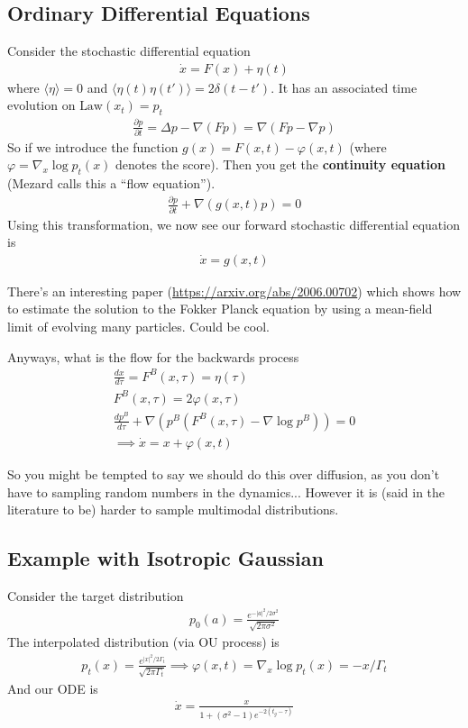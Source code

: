 \subsection{Ordinary Differential Equations}
Consider the stochastic differential equation
\begin{align}
	\dot x = F(x) + \eta(t)
\end{align}
where $\langle \eta \rangle = 0$ and $\langle \eta(t) \eta(t') \rangle = 2 \delta(t- t')$. It has an associated time evolution on $\text{Law}(x_t) = p_t$
\begin{align}
	\frac{\partial p}{\partial t} = \Delta p - \nabla (F p) = \nabla (F p - \nabla p)
\end{align}
So if we introduce the function $g(x) = F(x,t) - \varphi(x,t)$ (where $\varphi = \nabla_x \log p_t(x)$ denotes the score). Then you get the \textbf{continuity equation} (Mezard calls this a ``flow equation'').
\begin{align}
	\frac{\partial p}{\partial t} + \nabla (g(x,t) p) = 0
\end{align}
Using this transformation, we now see our forward stochastic differential equation is
\begin{align}
	\dot x = g(x,t)
\end{align}
\begin{sidework}
	There's an interesting paper (\url{https://arxiv.org/abs/2006.00702}) which shows how to estimate the solution to the Fokker Planck equation by using a mean-field limit of evolving many particles. Could be cool.
\end{sidework}
Anyways, what is the flow for the backwards process
\begin{align}
	\frac{dx}{d\tau} = F^B(x,\tau) = \eta(\tau)\\
	F^B (x,\tau) = 2 \varphi(x,\tau)\\
	\frac{dp^B}{d\tau} + \nabla(p^B (F^B(x,\tau) - \nabla \log p^B)) = 0\\
	\implies \dot x = x + \varphi(x,t)
\end{align}
\begin{sidework}
	So you might be tempted to say we should do this over diffusion, as you don't have to sampling random numbers in the dynamics... However it is (said in the literature to be) harder to sample multimodal distributions.
\end{sidework}
\subsection{Example with Isotropic Gaussian}
Consider the target distribution
\begin{align}
	p_0(a) = \frac{e^{-|a|^2/2 \sigma^2}}{\sqrt{2\pi \sigma^2}}
\end{align}
The interpolated distribution (via OU process) is
\begin{align}
	p_t(x) = \frac{e^{|x|^2/2\Gamma_t}}{\sqrt{2\pi \Gamma_t}} \implies \varphi(x,t) = \nabla_x \log p_t(x) = -x/\Gamma_t
\end{align}
And our ODE is
\begin{align}
	\dot x = \frac{x}{1 + (\sigma^2 - 1) e^{-2 (t_g - \tau)}}
\end{align}

